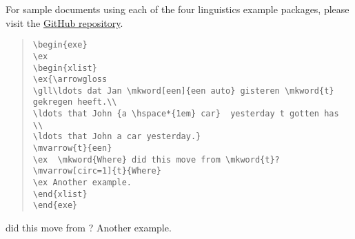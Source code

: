 \documentclass[11pt]{article}
\begin{document}
For sample documents using each of the four linguistics example packages, please visit the   \href{https://github.com/amunn/movement-arrows/}{GitHub repository}.

\begin{quote}
\begin{lstlisting}
\begin{exe}
\ex
\begin{xlist}
\ex{\arrowgloss
\gll\ldots dat Jan \mkword[een]{een auto} gisteren \mkword{t}  gekregen heeft.\\
\ldots that John {a \hspace*{1em} car}  yesterday t gotten has \\
\ldots that John a car yesterday.}
\mvarrow{t}{een}
\ex  \mkword{Where} did this move from \mkword{t}?
\mvarrow[circ=1]{t}{Where}
\ex Another example.
\end{xlist}
\end{exe}
\end{lstlisting}
\end{quote}

\begin{exe}
\ex
\begin{xlist}
\ex  {} did this move from ?
\ex Another example.
\end{xlist}
\end{exe}
\end{document}
